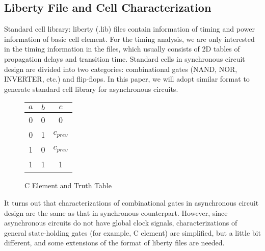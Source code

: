 \documentclass[sigconf, 10pt, twocolumn]{acmart}
\begin{document}
\subsection{Liberty File and Cell Characterization}
Standard cell library: liberty (.lib) files contain information of timing and power information of basic cell element. For the timing analysis, we are only interested in the timing information in the files, which usually consists of 2D tables of propagation delays and transition time. Standard cells in synchronous circuit design are divided into two categories: combinational gates (NAND, NOR, INVERTER, etc.) and flip-flops. In this paper, we will adopt similar format to generate standard cell library for asynchronous circuits.
\begin{figure}
\begin{minipage}[c]{0.45\linewidth}
\centering
{}

\end{minipage}
\begin{minipage}[c]{0.45\linewidth}
\centering
\begin{tabular}{|c|c|c|} \hline
$a$ & $b$ & $c$ \\ \hline
0 & 0 & 0 \\ \hline
0 & 1 & $c_{prev}$ \\ \hline
1 & 0 & $c_{prev}$ \\ \hline
1 & 1 & 1 \\ \hline
\end{tabular}
\end{minipage}
\caption{C Element and Truth Table}
\label{fig:Celement}
\end{figure}
It turns out that characterizations of combinational gates in asynchronous circuit design are the same as that in synchronous counterpart. However, since asynchronous circuits do not have global clock signals, characterizations of general state-holding gates (for example, C element) are simplified, but a little bit different, and some extensions of the format of liberty files are needed. 
\end{document}
